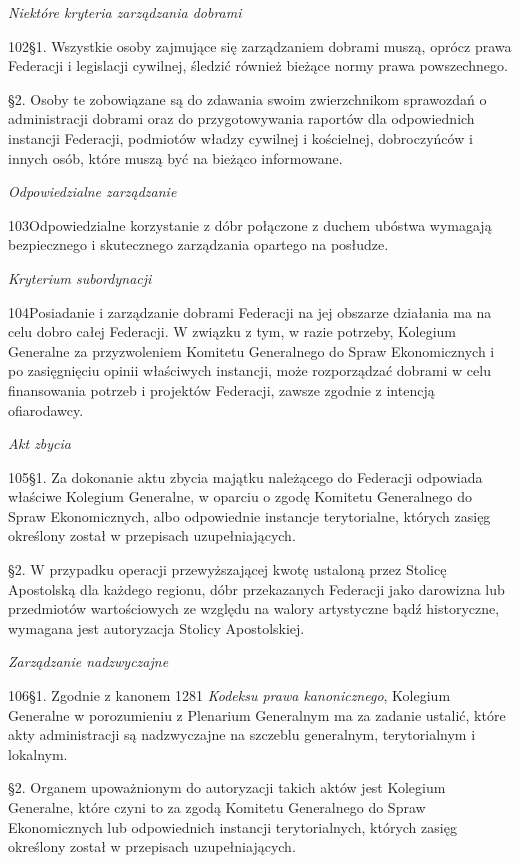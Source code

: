 ﻿\documentclass{book}
\newcommand{\lett}[1]{\lettrine[findent=6pt]{#1}}
\newcommand{\ssec}[1]{\vspace{1em}\textit{#1}\vspace{.5em}\nopagebreak}
\begin{document}
\ssec{Niektóre kryteria zarządzania dobrami}


\lett{102} \S{}1. Wszystkie osoby zajmujące się zarządzaniem dobrami muszą, oprócz prawa Federacji i legislacji cywilnej, śledzić również bieżące normy prawa powszechnego.


\S{}2. Osoby te zobowiązane są do zdawania swoim zwierzchnikom sprawozdań o administracji dobrami oraz do przygotowywania raportów dla odpowiednich instancji Federacji, podmiotów władzy cywilnej i kościelnej, dobroczyńców i innych osób, które muszą być na bieżąco informowane.


\ssec{Odpowiedzialne zarządzanie}


\lett{103} Odpowiedzialne korzystanie z dóbr połączone z duchem ubóstwa wymagają bezpiecznego i skutecznego zarządzania opartego na posłudze.


\ssec{Kryterium subordynacji}


\lett{104} Posiadanie i zarządzanie dobrami Federacji na jej obszarze działania ma na celu dobro całej Federacji. W związku z tym, w razie potrzeby, Kolegium Generalne za przyzwoleniem Komitetu Generalnego do Spraw Ekonomicznych i po zasięgnięciu opinii właściwych instancji, może rozporządzać dobrami w celu finansowania potrzeb i projektów Federacji, zawsze zgodnie z intencją ofiarodawcy.
 
\ssec{Akt zbycia}


\lett{105} \S{}1. Za dokonanie aktu zbycia majątku należącego do Federacji odpowiada właściwe Kolegium Generalne, w oparciu o zgodę Komitetu Generalnego do Spraw Ekonomicznych, albo odpowiednie instancje terytorialne, których zasięg określony został w przepisach uzupełniających.


\S{}2. W przypadku operacji przewyższającej kwotę ustaloną przez Stolicę Apostolską dla każdego regionu, dóbr przekazanych Federacji jako darowizna lub przedmiotów wartościowych ze względu na walory artystyczne bądź historyczne, wymagana jest autoryzacja Stolicy Apostolskiej.


\ssec{Zarządzanie nadzwyczajne}


\lett{106} \S{}1. Zgodnie z kanonem 1281  {\em Kodeksu prawa kanonicznego}, Kolegium Generalne w porozumieniu z Plenarium Generalnym ma za zadanie ustalić, które akty administracji są nadzwyczajne na szczeblu generalnym, terytorialnym i lokalnym.


\S{}2. Organem upoważnionym do autoryzacji takich aktów jest Kolegium Generalne, które czyni to za zgodą Komitetu Generalnego do Spraw Ekonomicznych lub odpowiednich instancji terytorialnych, których zasięg określony został w przepisach uzupełniających.
 
\end{document}

